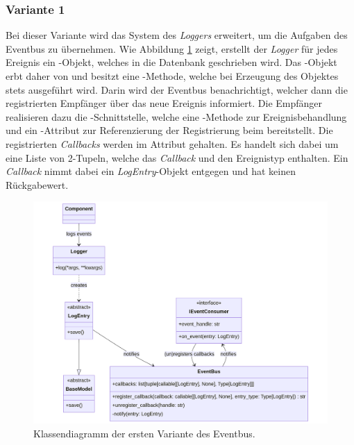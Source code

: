 \subsubsection*{Variante 1}

Bei dieser Variante wird das System des \emph{Loggers} erweitert, um die Aufgaben des Eventbus zu übernehmen. Wie Abbildung \ref{fig:eventbus-v1-class} zeigt, erstellt der \emph{Logger} für jedes Ereignis ein -Objekt, welches in die Datenbank geschrieben wird. Das -Objekt erbt daher von  und besitzt eine -Methode, welche bei Erzeugung des Objektes stets ausgeführt wird. Darin wird der Eventbus benachrichtigt, welcher dann die registrierten Empfänger über das neue Ereignis informiert. Die Empfänger realisieren dazu die -Schnittstelle, welche eine -Methode zur Ereignisbehandlung und ein -Attribut zur Referenzierung der Registrierung beim  bereitstellt. Die registrierten \emph{Callbacks} werden im Attribut  gehalten. Es handelt sich dabei um eine Liste von 2-Tupeln, welche das \emph{Callback} und den Ereignistyp enthalten. Ein \emph{Callback} nimmt dabei ein \emph{LogEntry}-Objekt entgegen und hat keinen Rückgabewert.

\begin{figure}[H]
	\centering
	\includegraphics[width=1.0\linewidth]{images/diagrams/eventbus-v1-class.png}
	\caption{Klassendiagramm der ersten Variante des Eventbus.}
	\label{fig:eventbus-v1-class}
\end{figure}

